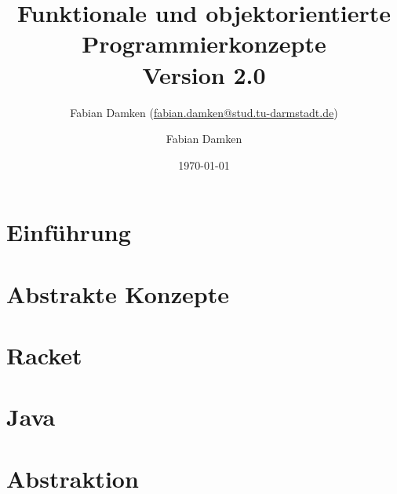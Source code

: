 \documentclass[a4paper, 11pt, accentcolor = tud3b]{tudreport}
\title{Funktionale und objektorientierte Programmierkonzepte \\ Version 2.0}
\subtitle{Fabian Damken (\href{mailto:fabian.damken@stud.tu-darmstadt.de?subject=[FoP-Skript]}{fabian.damken@stud.tu-darmstadt.de})}
\author{Fabian Damken}
\date{\today}
\begin{document}
	

    \maketitle
    \tableofcontents
    \listoftodos

    \chapter{Einführung}
	    \label{c:einfuehrung}
    
        

	\chapter{Abstrakte Konzepte}
		\label{c:abstrakte_konzepte}
	
		

    \chapter{Racket}
	    \label{c:racket}
    
        

    \chapter{Java}
	    \label{c:java}
    
        
    
    \chapter{Abstraktion}
	    \label{c:abstraktion}
    
	    
    

    
    
\end{document}
